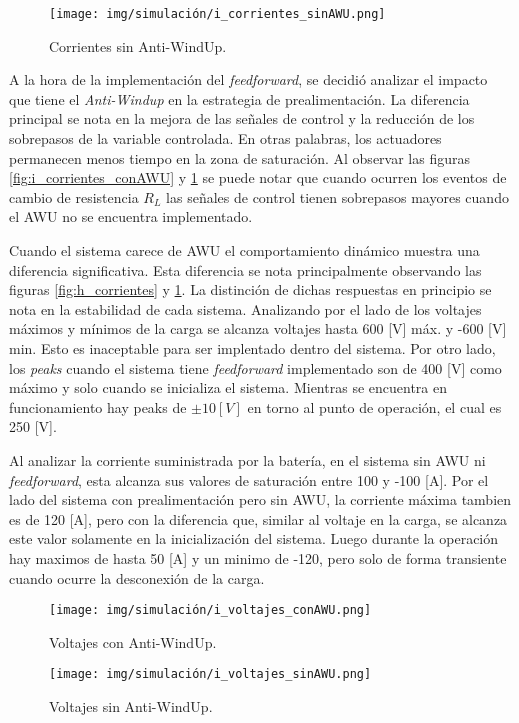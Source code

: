 \begin{figure}[H]
    \centering
    \texttt{[image: img/simulación/i\_corrientes\_sinAWU.png]}
    \caption{Corrientes sin Anti-WindUp.}
    \label{fig:i_corrientes_sinAWU}
\end{figure}

A la hora de la implementación del \textit{feedforward}, se decidió 
analizar el impacto que tiene el \textit{Anti-Windup} en la estrategia de prealimentación.
La diferencia principal se nota en la mejora de las señales de control y la reducción de los sobrepasos de la 
variable controlada. En otras palabras, los actuadores permanecen menos tiempo en la zona de saturación.
Al observar las figuras \ref{fig:i_corrientes_conAWU} y \ref{fig:i_corrientes_sinAWU}
se puede notar que cuando ocurren los eventos de cambio de resistencia $R_L$ las señales de control
tienen sobrepasos mayores cuando el AWU no se encuentra implementado. 

Cuando el sistema carece de AWU el comportamiento dinámico 
muestra una diferencia significativa. Esta diferencia se nota principalmente observando las 
figuras \ref{fig:h_corrientes} y \ref{fig:i_corrientes_sinAWU}.
La distinción de dichas respuestas en principio se nota en la estabilidad de cada sistema. Analizando por el lado de los
voltajes máximos y mínimos de la carga se alcanza voltajes hasta 600 [V] máx. y -600 [V] min. Esto es inaceptable
para ser implentado dentro del sistema. Por otro lado, los \textit{peaks} cuando el sistema tiene \textit{feedforward}
implementado son de 400 [V] como máximo y solo cuando se inicializa el sistema. Mientras se encuentra en funcionamiento
hay peaks de $\pm 10 [V]$ en torno al punto de operación, el cual es 250 [V].

Al analizar la corriente suministrada por la batería, en el sistema sin AWU ni \textit{feedforward}, esta alcanza sus
valores de saturación entre 100 y -100 [A]. Por el lado del sistema con prealimentación pero sin AWU, la corriente máxima
tambien es de 120 [A], pero con la diferencia que, similar al voltaje en la carga, se alcanza este valor solamente en
la inicialización del sistema. Luego durante la operación hay maximos de hasta 50 [A] y un minimo de -120, pero solo de forma 
transiente cuando ocurre la desconexión de la carga.


\begin{figure}[H]
    \centering
    \texttt{[image: img/simulación/i\_voltajes\_conAWU.png]}
    \caption{Voltajes con Anti-WindUp.}
    \label{fig:i_voltajes_conAWU}
\end{figure}

\begin{figure}[H]
    \centering
    \texttt{[image: img/simulación/i\_voltajes\_sinAWU.png]}
    \caption{Voltajes sin Anti-WindUp.}
    \label{fig:i_voltajes_sinAWU}
\end{figure}

\newpage